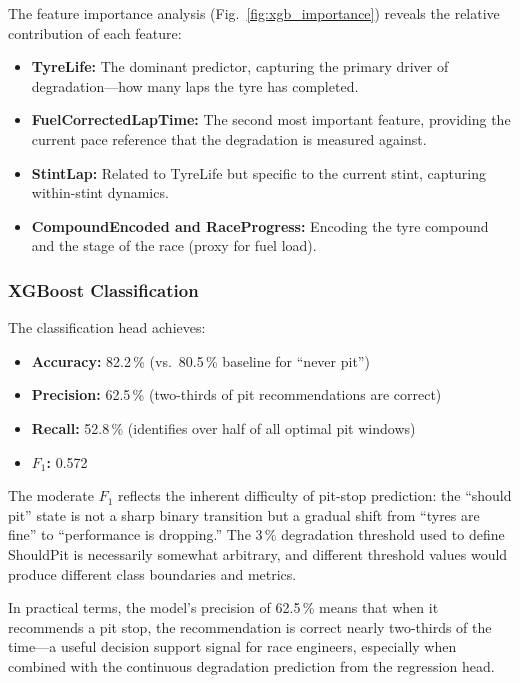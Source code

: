 \documentclass[journal,twoside]{IEEEtran}
\begin{document}
The feature importance analysis (Fig.~\ref{fig:xgb_importance}) reveals
the relative contribution of each feature:

\begin{itemize}[noitemsep]
  \item \textbf{TyreLife:} The dominant predictor, capturing the
  primary driver of degradation---how many laps the tyre has completed.
  \item \textbf{FuelCorrectedLapTime:} The second most important
  feature, providing the current pace reference that the degradation is
  measured against.
  \item \textbf{StintLap:} Related to TyreLife but specific to the
  current stint, capturing within-stint dynamics.
  \item \textbf{CompoundEncoded and RaceProgress:} Encoding the
  tyre compound and the stage of the race (proxy for fuel load).
\end{itemize}

\subsubsection{XGBoost Classification}

The classification head achieves:
\begin{itemize}[noitemsep]
  \item \textbf{Accuracy:} 82.2\,\% (vs.\ 80.5\,\% baseline for
  ``never pit'')
  \item \textbf{Precision:} 62.5\,\% (two-thirds of pit
  recommendations are correct)
  \item \textbf{Recall:} 52.8\,\% (identifies over half of all
  optimal pit windows)
  \item \textbf{$F_{1}$:} 0.572
\end{itemize}

The moderate $F_{1}$ reflects the inherent difficulty of pit-stop
prediction: the ``should pit'' state is not a sharp binary transition
but a gradual shift from ``tyres are fine'' to ``performance is
dropping.''  The 3\,\% degradation threshold used to define ShouldPit
is necessarily somewhat arbitrary, and different threshold values would
produce different class boundaries and metrics.

In practical terms, the model's precision of 62.5\,\% means that when
it recommends a pit stop, the recommendation is correct nearly
two-thirds of the time---a useful decision support signal for race
engineers, especially when combined with the continuous degradation
prediction from the regression head.
\end{document}
